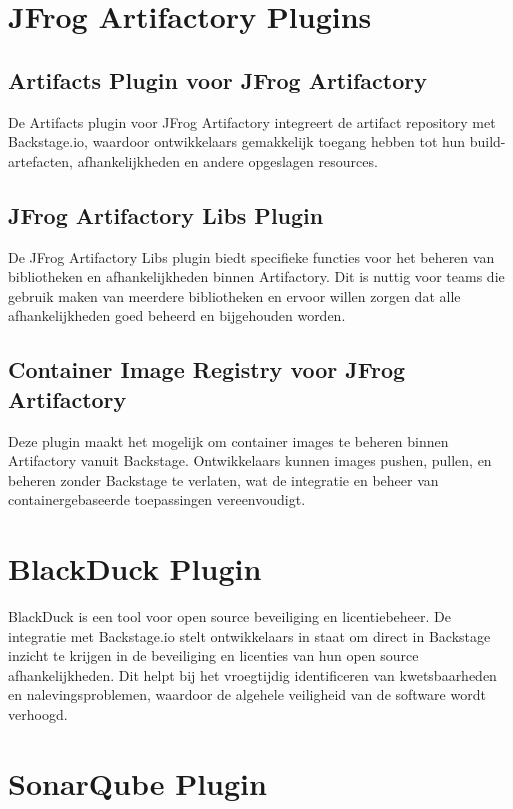 \section{JFrog Artifactory Plugins}

\subsection{Artifacts Plugin voor JFrog Artifactory}

De Artifacts plugin voor JFrog Artifactory integreert de artifact repository met Backstage.io, waardoor ontwikkelaars gemakkelijk toegang hebben tot hun build-artefacten, afhankelijkheden en andere opgeslagen resources.

\subsection{JFrog Artifactory Libs Plugin}

De JFrog Artifactory Libs plugin biedt specifieke functies voor het beheren van bibliotheken en afhankelijkheden binnen Artifactory. Dit is nuttig voor teams die gebruik maken van meerdere bibliotheken en ervoor willen zorgen dat alle afhankelijkheden goed beheerd en bijgehouden worden.

\subsection{Container Image Registry voor JFrog Artifactory}

Deze plugin maakt het mogelijk om container images te beheren binnen Artifactory vanuit Backstage. Ontwikkelaars kunnen images pushen, pullen, en beheren zonder Backstage te verlaten, wat de integratie en beheer van containergebaseerde toepassingen vereenvoudigt.

\section{BlackDuck Plugin}

BlackDuck is een tool voor open source beveiliging en licentiebeheer. De integratie met Backstage.io stelt ontwikkelaars in staat om direct in Backstage inzicht te krijgen in de beveiliging en licenties van hun open source afhankelijkheden. Dit helpt bij het vroegtijdig identificeren van kwetsbaarheden en nalevingsproblemen, waardoor de algehele veiligheid van de software wordt verhoogd.

\section{SonarQube Plugin}

